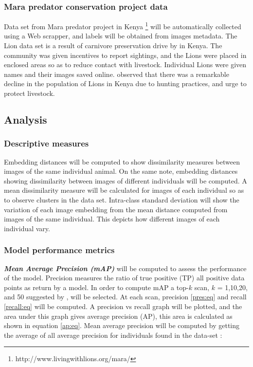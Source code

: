 \subsubsection{Mara predator conservation project data}
Data set from Mara predator project in Kenya \footnote{http://www.livingwithlions.org/mara/}  will be automatically collected using a Web scrapper, and labels will be obtained from images metadata. The Lion data set is a result of carnivore preservation drive by \citeauthor{frank2011living} \citeyear{frank2011living} \cite{frank2011living} in Kenya. The community was given incentives to report sightings, and the Lions were placed in enclosed areas so as to reduce contact with livestock. Individual Lions were given names and their images saved online. \citeauthor{frank2011living} \citeyear{frank2011living} \cite{frank2011living} observed that there was a remarkable decline in the population of Lions in Kenya due to hunting practices, and urge to protect livestock.  
\subsection{Analysis}
\subsubsection{Descriptive measures }
Embedding distances will be computed to show dissimilarity measures between images of the same individual animal. On the same note, embedding distances showing dissimilarity between images of different individuals will be computed.  A mean dissimilarity measure will be calculated for images of each individual so as to observe clusters in the data set. Intra-class standard deviation will show the variation of each image embedding from the mean distance computed from images of the same individual. This depicts how different images of each individual vary.

\subsubsection{Model performance  metrics}

\textbf{\textit{Mean Average Precision (mAP)}} will be computed to assess the performance of the model. Precision measures the ratio of true positive (TP) all positive data points as return by a model. In order to compute mAP a top-$k$ scan, $k$ = 1,10,20, and 50 suggested by \citeauthor{muller2001performance} \citeyear{muller2001performance} \cite{muller2001performance}, will be selected. At each scan, precision \ref{pres:eq} and recall \ref{recall:eq} will be computed. A precision vs recall graph will be plotted, and the area under this graph gives average precision (AP), this area is calculated as shown in equation \ref{ap:eq}.  Mean average precision will be computed by getting the average of all average precision for individuals found in the data-set \cite{everingham2015pascal}:

